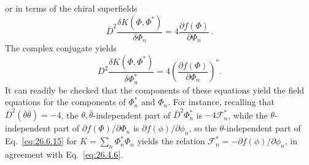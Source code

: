 or in terms of the chiral superfields
\begin{equation}
  \bar D^2
  \frac{\delta K(\Phi,\Phi^*)}{\delta\Phi_n}
  =4\frac{\partial f(\Phi)}{\partial\Phi_n}\,.
  \tag{26.6.15}\label{eq:26.6.15}
\end{equation}
The complex conjugate yields
\begin{equation}
  D^2
  \frac{\delta K(\Phi,\Phi^*)}{\delta\Phi_n^*}
  =4\left(\frac{\partial f(\Phi)}{\partial\Phi_n}\right)^* .
  \tag{26.6.16}\label{eq:26.6.16}
\end{equation}
It can readily be checked that the components of these equations yield the
field equations for the components of \(\Phi_n^*\) and \(\Phi_n\). For
instance, recalling that
\(\bar D^2(\bar\theta\bar\theta)=-4\), the
  \(\theta,\bar\theta\)-independent part of \(\bar D^2\Phi_n^*\) is
  \(-4\mathcal{F}_n^*\), while the \(\theta\)-independent part of
\(\partial f(\Phi)/\partial\Phi_n\) is
\(\partial f(\phi)/\partial\phi_n\), so the \(\theta\)-independent part of
Eq.~\eqref{eq:26.6.15} for \(K=\sum_n\Phi_n^*\Phi_n\) yields the relation
\(\mathcal{F}_n^*=-\partial f(\phi)/\partial\phi_n\), in agreement with
Eq.~\eqref{eq:26.4.6}.

